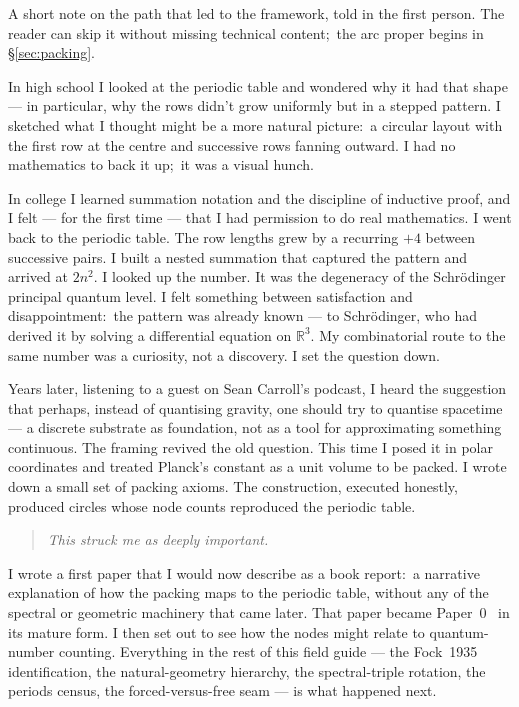 \documentclass[11pt,a4paper]{article}
\newcommand{\R}{\mathbb{R}}
\begin{document}
A short note on the path that led to the framework, told in the first
person.  The reader can skip it without missing technical content;\ the
arc proper begins in \S\ref{sec:packing}.

In high school I looked at the periodic table and wondered why it had
that shape --- in particular, why the rows didn't grow uniformly but
in a stepped pattern.  I sketched what I thought might be a more
natural picture:\ a circular layout with the first row at the centre
and successive rows fanning outward.  I had no mathematics to back it
up;\ it was a visual hunch.

In college I learned summation notation and the discipline of
inductive proof, and I felt --- for the first time --- that I had
permission to do real mathematics.  I went back to the periodic
table.  The row lengths grew by a recurring $+4$ between successive
pairs.  I built a nested summation that captured the pattern and
arrived at $2n^2$.  I looked up the number.  It was the degeneracy of
the Schr\"odinger principal quantum level.  I felt something between
satisfaction and disappointment:\ the pattern was already known ---
to Schr\"odinger, who had derived it by solving a differential
equation on $\R^3$.  My combinatorial route to the same number was a
curiosity, not a discovery.  I set the question down.

Years later, listening to a guest on Sean Carroll's podcast, I heard
the suggestion that perhaps, instead of quantising gravity, one
should try to quantise spacetime --- a discrete substrate as
foundation, not as a tool for approximating something continuous.
The framing revived the old question.  This time I posed it in polar
coordinates and treated Planck's constant as a unit volume to be
packed.  I wrote down a small set of packing axioms.  The
construction, executed honestly, produced circles whose node counts
reproduced the periodic table.

\begin{quote}
\itshape
This struck me as deeply important.
\end{quote}

I wrote a first paper that I would now describe as a book report:\ a
narrative explanation of how the packing maps to the periodic table,
without any of the spectral or geometric machinery that came later.
That paper became Paper~0~\cite{loutey_paper0} in its mature form.  I
then set out to see how the nodes might relate to quantum-number
counting.  Everything in the rest of this field guide --- the
Fock~1935 identification, the natural-geometry hierarchy, the
spectral-triple rotation, the periods census, the
forced-versus-free seam --- is what happened next.
\end{document}
